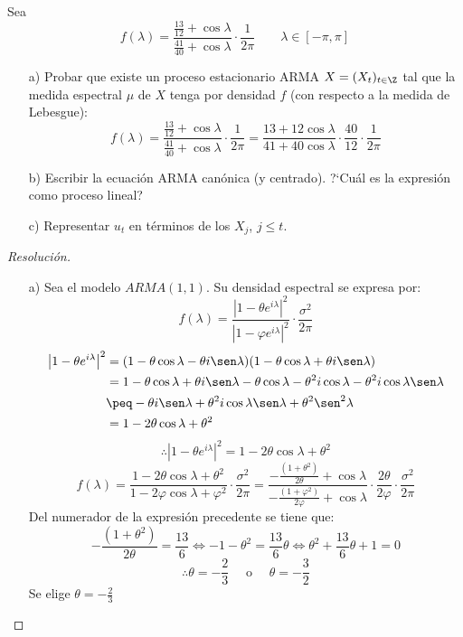 \begin{ejemplo}
Sea 
\[
 f(\lambda )=\frac{\frac{13}{12}+\cos \lambda }{\frac{41}{40}+\cos 
\lambda }\cdot\frac{1}{2\pi }\qquad \lambda \in \left[ {-\pi ,\pi } 
\right]
\]

\begin{enumerate}
\item[a)] Probar que existe un proceso estacionario ARMA $X=(X_{t} )_{t\in \Z} $ tal que la medida espectral $\mu $ de $X$ tenga por densidad $f$ (con respecto a la medida de Lebesgue):
\[
f(\lambda )=\frac{\frac{13}{12}+\cos \lambda }{\frac{41}{40}+\cos \lambda 
}\cdot\frac{1}{2\pi }=\frac{13+12 \cos \lambda }{41+40\cos \lambda }\cdot\frac{40}{12}\cdot\frac{1}{2\pi }
\]

\item[b)] Escribir la ecuaci\'{o}n ARMA can\'{o}nica (y centrado). ?`Cu\'{a}l es la expresi\'{o}n como proceso lineal?

\item[c)] Representar $u_{{t}}$ en t\'{e}rminos de los $X_{j}$, $j\le t$.
\end{enumerate}


\begin{proof}[Resoluci\'{o}n]
\quad 
\begin{enumerate}
\item[a)] Sea el modelo $ARMA(1, 1)$. Su densidad espectral se expresa por:
\[
f(\lambda )=\frac{\left| {1-\theta e^{i\lambda }} \right|^{2}}{\left| 
{1-\varphi e^{i\lambda }} \right|^{2}}\cdot\frac{\sigma^{2}}{2\pi }
\]
\begin{align*}
\left| {1-\theta e^{i\lambda }} \right|^{2}
	&=(1-\theta \cos \lambda -\theta i \sen\lambda )(1-\theta \cos \lambda +\theta i\sen\lambda )\\
	&=1-\theta \cos \lambda +\theta i\sen\lambda -\theta \cos \lambda -\theta^{2}i\cos \lambda -\theta^{2}i\cos \lambda \sen\lambda\\
	&\peq - \theta i\sen\lambda +\theta^{2}i\cos \lambda \sen\lambda +\theta^{2}\sen^{2}\lambda\\
	&=1-2\theta \cos \lambda +\theta^{2}
\end{align*}
\[
\therefore\left| {1-\theta e^{i\lambda }} \right|^{2}=1-2\theta \cos \lambda +\theta 
^{2}
\]
\[
f(\lambda )=\frac{1-2\theta \cos \lambda +\theta^{2}}{1-2\varphi \cos \lambda +\varphi^{2}}\cdot\frac{\sigma^{2}}{2\pi }=\frac{-\frac{(1+\theta^{2})}{2\theta }+\cos \lambda }{-\frac{(1+\varphi^{2})}{2\varphi }+\cos \lambda }\cdot\frac{2\theta }{2\varphi }\cdot\frac{\sigma^{2}}{2\pi }
\]
Del numerador de la expresi\'{o}n precedente se tiene que:
\[
-\frac{(1+\theta^{2})}{2\theta }=\frac{13}{6}\Longleftrightarrow -1-\theta ^{2}=\frac{13}{6}\theta \Longleftrightarrow \theta^{2}+\frac{13}{6}\theta +1=0
\]
\[
\therefore\theta =-\frac{2}{3}\quad\text{ o }\quad\theta =-\frac{3}{2}
\]
Se elige $\theta =-\frac{2}{3}$ 


\end{enumerate}
\end{proof}
\end{ejemplo}
